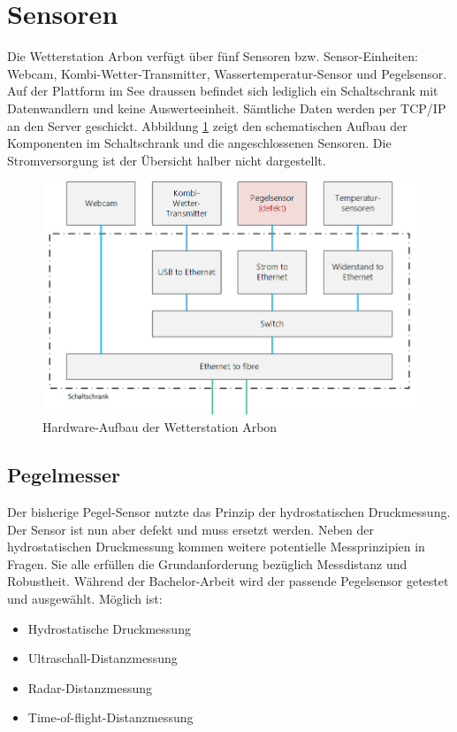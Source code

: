 \section{Sensoren}
Die Wetterstation Arbon verfügt über fünf Sensoren bzw. Sensor-Einheiten: Webcam, Kombi-Wetter-Transmitter, Wassertemperatur-Sensor und Pegelsensor. Auf der Plattform im See draussen befindet sich lediglich ein Schaltschrank mit Datenwandlern und keine Auswerteeinheit. Sämtliche Daten werden per TCP/IP an den Server geschickt. Abbildung \ref{img:schaltschrank} zeigt den schematischen Aufbau der Komponenten im Schaltschrank und die angeschlossenen Sensoren. Die Stromversorgung ist der Übersicht halber nicht dargestellt.

\begin{figure}[h]
	\centering
	\includegraphics[width=1\linewidth]{img/schaltschrank}
	\caption{Hardware-Aufbau der Wetterstation Arbon}
	\label{img:schaltschrank}
\end{figure}



\subsection{Pegelmesser}
Der bisherige Pegel-Sensor nutzte das Prinzip der hydrostatischen Druckmessung. Der Sensor ist nun aber defekt und muss ersetzt werden. Neben der hydrostatischen Druckmessung kommen weitere potentielle Messprinzipien in Fragen. Sie alle erfüllen die Grundanforderung bezüglich Messdistanz und Robustheit. Während der Bachelor-Arbeit wird der passende Pegelsensor getestet und ausgewählt. Möglich ist:

\begin{itemize}  
\item Hydrostatische Druckmessung
\item Ultraschall-Distanzmessung
\item Radar-Distanzmessung
\item Time-of-flight-Distanzmessung
\end{itemize}

